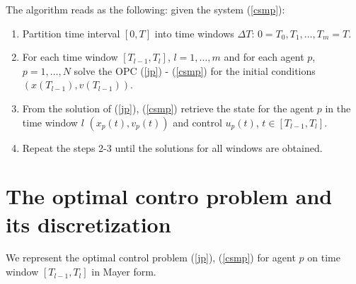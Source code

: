 \documentclass[a4paper,10pt, english]{article}
\begin{document}
   The algorithm reads as the following: given the system (\ref{csmp}):
   \begin{enumerate}
   \item Partition time interval $[0, T]$ into time windows $\Delta T$: $0 = T_0, T_1, \dots, T_m = T$.
   \item For each time window  $[T_{l-1}, T_{l}]$, $l = 1, \dots, m$ and for each agent $p$, $p = 1, \dots, N$  solve the OPC (\ref{jp}) - (\ref{csmp}) for the initial conditions $(x(T_{l-1}), v(T_{l-1}))$.
   \item From the solution of (\ref{jp}), (\ref{csmp})  retrieve the  state for the agent $p$ in the time window $l$ $(x_p(t), v_p(t))$ and control $u_p(t)$, $t\in [T_{l-1}, T_{l}]$.
   \item Repeat the steps 2-3 until the solutions for all windows are obtained. 
 \end{enumerate}
 



































 
 
 \section{The optimal contro problem and its discretization}
  We represent the optimal control problem  (\ref{jp}), (\ref{csmp}) for agent $p$ on time window $[T_{l-1}, T_{l}]$ in Mayer form.
  
\end{document}

